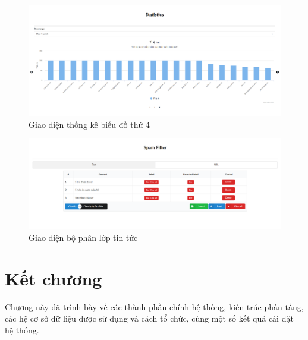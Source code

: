 \begin{figure}[H]
	\centering
	\includegraphics[width=0.96\linewidth]{Chapter3/Chapter3Figs/Chart3.png}
  \caption{Giao diện thống kê biểu đồ thứ 4}
	\label{fig:streamingkeywords}
\end{figure}

\begin{figure}[H]
		\centering
	\includegraphics[width=0.96\linewidth]{Chapter3/Chapter3Figs/Filter.png}
	\caption{Giao diện bộ phân lớp tin tức}
	\label{fig:startclustering}
\end{figure}

\section{Kết chương}
Chương này đã trình bày về các thành phần chính hệ thống, kiến trúc phân tầng, các hệ cơ sở dữ liệu được sử dụng và cách tổ chức, cùng một số kết quả cài đặt hệ thống.